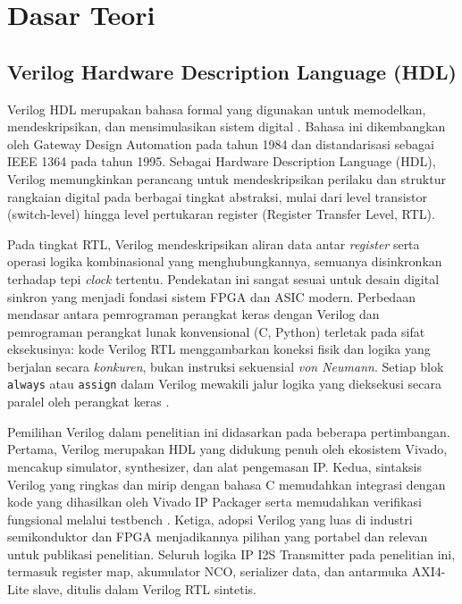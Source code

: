 \section{Dasar Teori}

\subsection{Verilog Hardware Description Language (HDL)}

Verilog HDL merupakan bahasa formal yang digunakan untuk memodelkan, mendeskripsikan, dan mensimulasikan sistem digital \citep{palnitkar_verilog_2003}. Bahasa ini dikembangkan oleh Gateway Design Automation pada tahun 1984 dan distandarisasi sebagai IEEE 1364 pada tahun 1995. Sebagai Hardware Description Language (HDL), Verilog memungkinkan perancang untuk mendeskripsikan perilaku dan struktur rangkaian digital pada berbagai tingkat abstraksi, mulai dari level transistor (switch-level) hingga level pertukaran register (Register Transfer Level, RTL).

Pada tingkat RTL, Verilog mendeskripsikan aliran data antar \textit{register} serta operasi logika kombinasional yang menghubungkannya, semuanya disinkronkan terhadap tepi \textit{clock} tertentu. Pendekatan ini sangat sesuai untuk desain digital sinkron yang menjadi fondasi sistem FPGA dan ASIC modern. Perbedaan mendasar antara pemrograman perangkat keras dengan Verilog dan pemrograman perangkat lunak konvensional (C, Python) terletak pada sifat eksekusinya: kode Verilog RTL menggambarkan koneksi fisik dan logika yang berjalan secara \textit{konkuren}, bukan instruksi sekuensial \textit{von Neumann}. Setiap blok \texttt{always} atau \texttt{assign} dalam Verilog mewakili jalur logika yang dieksekusi secara paralel oleh perangkat keras \citep{harris_harris_digital_2022}.

Pemilihan Verilog dalam penelitian ini didasarkan pada beberapa pertimbangan. Pertama, Verilog merupakan HDL yang didukung penuh oleh ekosistem Vivado, mencakup simulator, synthesizer, dan alat pengemasan IP. Kedua, sintaksis Verilog yang ringkas dan mirip dengan bahasa C memudahkan integrasi dengan kode yang dihasilkan oleh Vivado IP Packager serta memudahkan verifikasi fungsional melalui testbench \citep{chu_fpga_prototyping_2011}. Ketiga, adopsi Verilog yang luas di industri semikonduktor dan FPGA menjadikannya pilihan yang portabel dan relevan untuk publikasi penelitian. Seluruh logika IP I2S Transmitter pada penelitian ini, termasuk register map, akumulator NCO, serializer data, dan antarmuka AXI4-Lite slave, ditulis dalam Verilog RTL sintetis.

